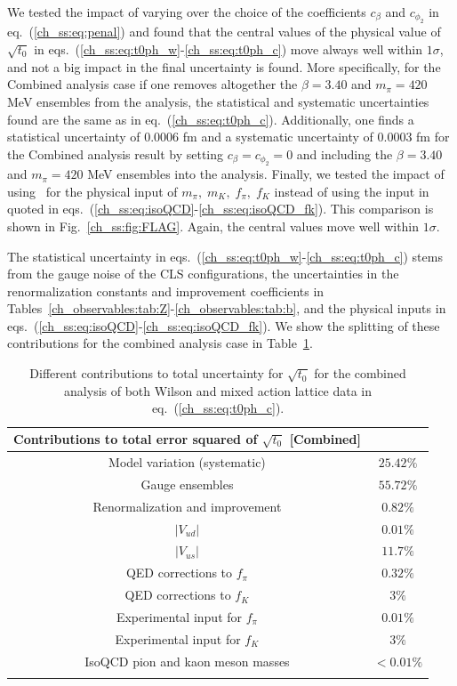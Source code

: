 We tested the impact of varying over the choice of the coefficients $c_{\beta}$ and $c_{\phi_2}$ in eq.~(\ref{ch_ss:eq:penal}) and found that the central values of the physical value of $\sqrt{t_0}$ in eqs.~(\ref{ch_ss:eq:t0ph_w}-\ref{ch_ss:eq:t0ph_c}) move always well within $1\sigma$, and not a big impact in the final uncertainty is found. More specifically, for the Combined analysis case if one removes altogether the $\beta=3.40$ and $m_{\pi}=420$ MeV ensembles from the analysis, the statistical and systematic uncertainties found are the same as in eq.~(\ref{ch_ss:eq:t0ph_c}). Additionally, one finds a statistical uncertainty of $0.0006$ fm and a systematic uncertainty of $0.0003$ fm for the Combined analysis result by setting $c_{\beta}=c_{\phi_2}=0$ and including the $\beta=3.40$ and $m_{\pi}=420$ MeV ensembles into the analysis. Finally, we tested the impact of using~\citep{FLAG16} for the physical input of $m_{\pi},\;m_K,\;f_{\pi},\;f_K$ instead of using the input in~\citep{FlavourLatticeAveragingGroupFLAG:2021npn} quoted in eqs.~(\ref{ch_ss:eq:isoQCD}-\ref{ch_ss:eq:isoQCD_fk}). This comparison is shown in Fig.~\ref{ch_ss:fig:FLAG}. Again, the central values move well within $1\sigma$.

The statistical uncertainty in eqs.~(\ref{ch_ss:eq:t0ph_w}-\ref{ch_ss:eq:t0ph_c}) stems from the gauge noise of the CLS configurations, the uncertainties in the renormalization constants and improvement coefficients in Tables~\ref{ch_observables:tab:Z}-\ref{ch_observables:tab:b}, and the physical inputs in eqs.~(\ref{ch_ss:eq:isoQCD}-\ref{ch_ss:eq:isoQCD_fk}). We show the splitting of these contributions for the combined analysis case in Table~\ref{ch_ss:tab:stat}.

\begin{longtable}{c c}
\label{ch_ss:tab:stat}
	Contributions to total error squared of $\sqrt{t_0}$ [Combined] & \\
	\toprule
	Model variation (systematic) & $25.42\%$ \\
	Gauge ensembles & $55.72\%$ \\
	Renormalization and improvement & $0.82\%$ \\
	$\left|V_{ud}\right|$ & $0.01\%$ \\
	$\left|V_{us}\right|$ & $11.7\%$ \\
	QED corrections to $f_{\pi}$ & $0.32\%$ \\
	QED corrections to $f_K$ & $3\%$ \\
	Experimental input for $f_{\pi}$ & $0.01\%$ \\
	Experimental input for $f_K$ & $3\%$ \\
	IsoQCD pion and kaon meson masses & $<0.01\%$ \\
    \bottomrule
    \caption{Different contributions to total uncertainty for $\sqrt{t_0}$ for the combined analysis of both Wilson and mixed action lattice data in eq.~(\ref{ch_ss:eq:t0ph_c}).}
\end{longtable}

